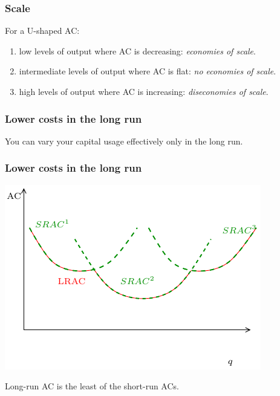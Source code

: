 \documentclass[xcolor=pdftex,dvipsnames]{beamer}
\begin{document}
\begin{frame}
\frametitle{Scale}

For a U-shaped AC:
\begin{enumerate}
[<+->]
\item low levels of output where AC is decreasing: \emph{economies of
    scale}.
\item intermediate levels of output where AC is flat: \emph{no economies of
    scale}.
\item high levels of output where AC is increasing: \emph{diseconomies of
    scale}.
\end{enumerate}
\bigskip


\bigskip
{}
\end{frame}




\begin{frame}
\frametitle{Lower costs in the long run}
You can vary your capital usage effectively only in the long run. 
\bigskip

\bigskip


\bigskip
{}
\end{frame}




\begin{frame}
\frametitle{Lower costs in the long run}
\begin{center}
\includegraphics{pics/LRAC}
 \end{center}
Long-run AC is the least of the short-run ACs.
\end{frame}
\end{document}
